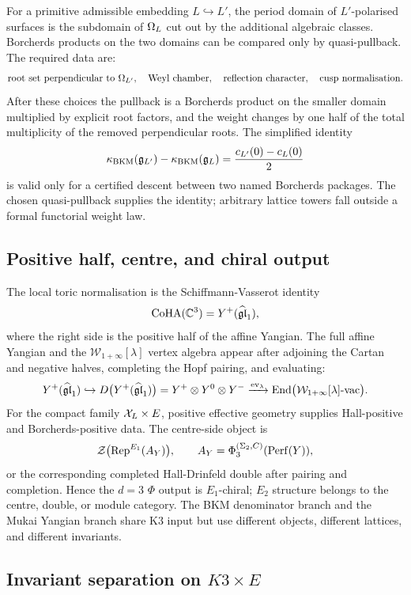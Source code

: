 For a primitive admissible embedding $L\hookrightarrow L'$, the period
domain of $L'$-polarised surfaces is the subdomain of $\Omega_L$ cut out by
the additional algebraic classes.  Borcherds products on the two domains
can be compared only by quasi-pullback.  The required data are:
\[
  \text{root set perpendicular to }\Omega_{L'},\quad
  \text{Weyl chamber},\quad
  \text{reflection character},\quad
  \text{cusp normalisation}.
\]
After these choices the pullback is a Borcherds product on the smaller
domain multiplied by explicit root factors, and the weight changes by
one half of the total multiplicity of the removed perpendicular roots.
The simplified identity
\[
  \kappa_{\mathrm{BKM}}(\mathfrak{g}_{L'})-\kappa_{\mathrm{BKM}}(\mathfrak{g}_{L})
  =
  \frac{c_{L'}(0)-c_L(0)}{2}
\]
is valid only for a certified descent between two named Borcherds
packages.  The chosen quasi-pullback supplies the identity; arbitrary
lattice towers fall outside a formal functorial weight law.

\subsection*{Positive half, centre, and chiral output}

The local toric normalisation is the Schiffmann-Vasserot identity
\[
  \mathrm{CoHA}(\mathbb{C}^3)=Y^+(\widehat{\mathfrak{gl}}_1),
\]
where the right side is the positive half of the affine Yangian.  The
full affine Yangian and the $\mathcal W_{1+\infty}[\lambda]$ vertex
algebra appear after adjoining the Cartan and negative halves, completing
the Hopf pairing, and evaluating:
\[
  Y^+(\widehat{\mathfrak{gl}}_1)
  \hookrightarrow
  D\bigl(Y^+(\widehat{\mathfrak{gl}}_1)\bigr)
  =
  Y^+\otimes Y^0\otimes Y^-
  \xrightarrow{\mathrm{ev}_{\lambda}}
  \mathrm{End}\bigl(\mathcal W_{1+\infty}[\lambda]\text{-vac}\bigr).
\]
For the compact family $\mathcal{X}_L\times E$, positive effective geometry
supplies Hall-positive and Borcherds-positive data.  The centre-side
object is
\[
  \mathcal Z\bigl(\mathrm{Rep}^{E_1}(A_Y)\bigr),
  \qquad
  A_Y=\Phi_3^{(\Sigma_2,C)}(\mathrm{Perf}(Y)),
\]
or the corresponding completed Hall-Drinfeld double after pairing and
completion.  Hence the $d=3$ $\Phi$ output is $E_1$-chiral; $E_2$
structure belongs to the centre, double, or module category.  The BKM
denominator branch and the Mukai Yangian branch share K3 input but use
different objects, different lattices, and different invariants.

\subsection*{Invariant separation on \(K3\times E\)}

